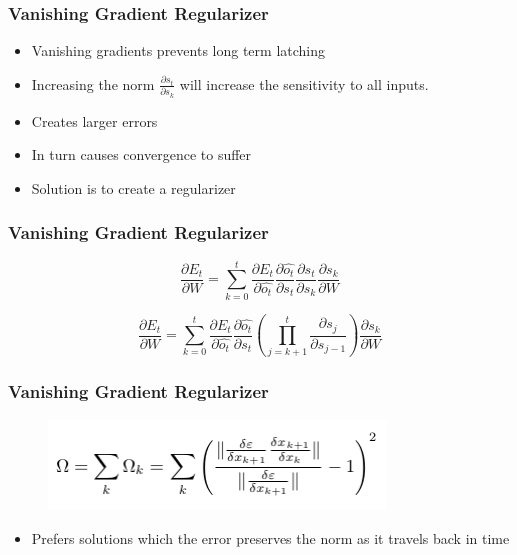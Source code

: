 \documentclass{beamer}
\begin{document}
\begin{frame}
	\frametitle{Vanishing Gradient Regularizer}
	
	\begin{itemize}
		\item{Vanishing gradients prevents long term latching}
		\item{Increasing the norm $\frac{\partial s_{t}}{\partial s_{k}}$ will increase the sensitivity to all inputs.}
		\item{Creates larger errors}
		\item{In turn causes convergence to suffer}
		\item{Solution is to create a regularizer}
	\end{itemize}
\end{frame}


\begin{frame}
	\frametitle{Vanishing Gradient Regularizer}
	
	\[
		\frac{\partial E_{t}}{\partial W} =
			\sum_{k = 0}^{t} 
			\frac{\partial E_{t}}{\partial \hat{o_{t}}}
			\frac{\partial \hat{o_{t}}}{\partial s_{t}}
			\frac{\partial s_{t}}{\partial s_{k}}
			\frac{\partial s_{k}}{\partial W}
	\]
	
	\[
		\frac{\partial E_{t}}{\partial W} =
			\sum_{k = 0}^{t} 
				\frac{\partial E_{t}}{\partial \hat{o_{t}}}
				\frac{\partial \hat{o_{t}}}{\partial s_{t}}
				\left(
					\prod_{j = k + 1}^{t}
					\frac{\partial s_{j}}{\partial s_{j - 1}}
				\right)
				\frac{\partial s_{k}}{\partial W}
	\]
\end{frame}


\begin{frame}
	\frametitle{Vanishing Gradient Regularizer}
	
	\begin{figure}
		\includegraphics[width=0.8\textwidth]{imgs/vanishing_gradient_regularizer}
	\end{figure}
	
	\begin{itemize}
		\item{Prefers solutions which the error preserves the norm as it travels back in time}
	\end{itemize}
\end{frame}
\end{document}
